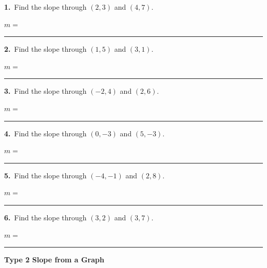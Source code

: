 \documentclass[11pt,letterpaper]{article}
\newcommand{\topicbar}[1]{\needspace{4.5cm}\par\vspace{5mm}
  \begin{tcolorbox}[enhanced,colback=fmtitle,colframe=fmtitle,arc=2mm,left=4mm,top=1.5mm,bottom=1.5mm]
  \color{white}\bfseries\large #1
  \end{tcolorbox}}
\begin{document}
\needspace{3.1cm}\par\vspace{3mm}\noindent \begin{minipage}[t][2.6cm]{0.48\linewidth}\raggedright{\color{fmturn}\bfseries 1.}\ Find the slope through $(2, 3)$ and $(4, 7)$.\par\vfill\hfill $m =$\ \rule{3.2cm}{0.4pt}\end{minipage}\hfill \begin{minipage}[t][2.6cm]{0.48\linewidth}\raggedright{\color{fmturn}\bfseries 2.}\ Find the slope through $(1, 5)$ and $(3, 1)$.\par\vfill\hfill $m =$\ \rule{3.2cm}{0.4pt}\end{minipage}\par
\needspace{3.1cm}\par\vspace{3mm}\noindent \begin{minipage}[t][2.6cm]{0.48\linewidth}\raggedright{\color{fmturn}\bfseries 3.}\ Find the slope through $(-2, 4)$ and $(2, 6)$.\par\vfill\hfill $m =$\ \rule{3.2cm}{0.4pt}\end{minipage}\hfill \begin{minipage}[t][2.6cm]{0.48\linewidth}\raggedright{\color{fmturn}\bfseries 4.}\ Find the slope through $(0, -3)$ and $(5, -3)$.\par\vfill\hfill $m =$\ \rule{3.2cm}{0.4pt}\end{minipage}\par
\needspace{3.1cm}\par\vspace{3mm}\noindent \begin{minipage}[t][2.6cm]{0.48\linewidth}\raggedright{\color{fmturn}\bfseries 5.}\ Find the slope through $(-4, -1)$ and $(2, 8)$.\par\vfill\hfill $m =$\ \rule{3.2cm}{0.4pt}\end{minipage}\hfill \begin{minipage}[t][2.6cm]{0.48\linewidth}\raggedright{\color{fmturn}\bfseries 6.}\ Find the slope through $(3, 2)$ and $(3, 7)$.\par\vfill\hfill $m =$\ \rule{3.2cm}{0.4pt}\end{minipage}\par
\needspace{9cm}\topicbar{Type 2 \quad Slope from a Graph}
\end{document}
